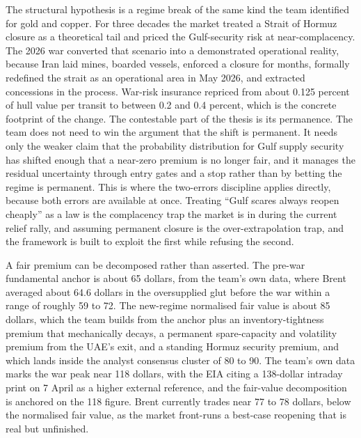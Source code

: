 \documentclass[11pt,a4paper]{article}
\begin{document}
The structural hypothesis is a regime break of the same kind the team identified for gold and copper. For three decades the market treated a Strait of Hormuz closure as a theoretical tail and priced the Gulf-security risk at near-complacency. The 2026 war converted that scenario into a demonstrated operational reality, because Iran laid mines, boarded vessels, enforced a closure for months, formally redefined the strait as an operational area in May 2026, and extracted concessions in the process. War-risk insurance repriced from about 0.125 percent of hull value per transit to between 0.2 and 0.4 percent, which is the concrete footprint of the change. The contestable part of the thesis is its permanence. The team does not need to win the argument that the shift is permanent. It needs only the weaker claim that the probability distribution for Gulf supply security has shifted enough that a near-zero premium is no longer fair, and it manages the residual uncertainty through entry gates and a stop rather than by betting the regime is permanent. This is where the two-errors discipline applies directly, because both errors are available at once. Treating ``Gulf scares always reopen cheaply'' as a law is the complacency trap the market is in during the current relief rally, and assuming permanent closure is the over-extrapolation trap, and the framework is built to exploit the first while refusing the second.

A fair premium can be decomposed rather than asserted. The pre-war fundamental anchor is about 65 dollars, from the team's own data, where Brent averaged about 64.6 dollars in the oversupplied glut before the war within a range of roughly 59 to 72. The new-regime normalised fair value is about 85 dollars, which the team builds from the anchor plus an inventory-tightness premium that mechanically decays, a permanent spare-capacity and volatility premium from the UAE's exit, and a standing Hormuz security premium, and which lands inside the analyst consensus cluster of 80 to 90. The team's own data marks the war peak near 118 dollars, with the EIA citing a 138-dollar intraday print on 7 April as a higher external reference, and the fair-value decomposition is anchored on the 118 figure. Brent currently trades near 77 to 78 dollars, below the normalised fair value, as the market front-runs a best-case reopening that is real but unfinished.
\end{document}
